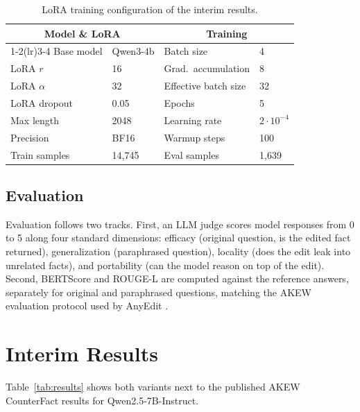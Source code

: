 \documentclass[10pt,a4paper]{article}
\begin{document}
\begin{table}[ht]
\centering
\footnotesize
\begin{tabular}{llll}
\toprule
\multicolumn{2}{c}{\textbf{Model \& LoRA}} & \multicolumn{2}{c}{\textbf{Training}}\\
\cmidrule(lr){1-2}\cmidrule(lr){3-4}
Base model    & Qwen3-4b & Batch size            & 4\\
LoRA $r$      & 16       & Grad.\ accumulation   & 8\\
LoRA $\alpha$ & 32       & Effective batch size  & 32\\
LoRA dropout  & 0.05     & Epochs                & 5\\
Max length    & 2048     & Learning rate         & $2\cdot10^{-4}$\\
Precision     & BF16     & Warmup steps          & 100\\
\midrule
Train samples & 14{,}745 & Eval samples          & 1{,}639\\
\bottomrule
\end{tabular}
\caption{LoRA training configuration of the interim results.}
\label{tab:lora}
\end{table}

\subsection{Evaluation}
Evaluation follows two tracks. First, an LLM judge scores model responses from 0 to 5
along four standard dimensions: efficacy (original question, is the edited fact
returned), generalization (paraphrased question), locality (does the edit leak into
unrelated facts), and portability (can the model reason on top of the edit). Second,
BERTScore and ROUGE-L are computed against the reference answers, separately for original
and paraphrased questions, matching the AKEW evaluation protocol used by
AnyEdit \citep{jiang2025anyediteditknowledgeencoded}.

\section{Interim Results}
Table~\ref{tab:results} shows both variants next to the published AKEW CounterFact
results for Qwen2.5-7B-Instruct.
\end{document}
